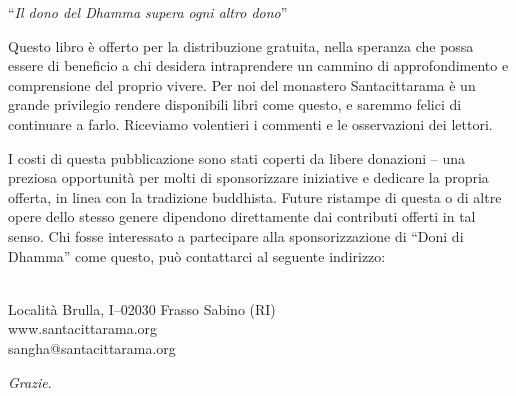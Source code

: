 
\thispagestyle{empty}

\newsavebox{\giftofdhammabox}

\begin{lrbox}{\giftofdhammabox}\begin{minipage}{\linewidth}
{\setlength{\parskip}{\baselineskip}
\centering

``\emph{\large Il dono del Dhamma supera ogni altro dono}''

Questo libro è offerto per la distribuzione gratuita, nella speranza che
possa essere di beneficio a chi desidera intraprendere un cammino di
approfondimento e comprensione del proprio vivere. Per noi del monastero
Santacittarama è un grande privilegio rendere disponibili libri come
questo, e saremmo felici di continuare a farlo. Riceviamo volentieri i
commenti e le osservazioni dei lettori.

I costi di questa pubblicazione sono stati coperti da libere donazioni
-- una preziosa opportunità per molti di sponsorizzare iniziative e
dedicare la propria offerta, in linea con la tradizione buddhista.
Future ristampe di questa o di altre opere dello stesso genere dipendono
direttamente dai contributi offerti in tal senso. Chi fosse interessato
a partecipare alla sponsorizzazione di ``Doni di Dhamma'' come questo,
può contattarci al seguente indirizzo:

\\[0.2\baselineskip]
Località Brulla, I--02030 Frasso Sabino (RI)\\
www.santacittarama.org\\
sangha@santacittarama.org

\emph{Grazie}.

}
\end{minipage}\end{lrbox}%
